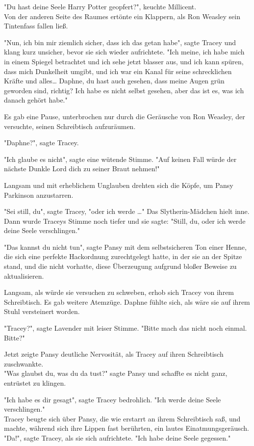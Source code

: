 {"Du hast deine Seele Harry Potter geopfert?", keuchte Millicent.\\ Von der anderen Seite des Raumes ertönte ein Klappern, als Ron Weasley sein Tintenfass fallen ließ.

"Nun, ich bin mir ziemlich sicher, dass ich das getan habe", sagte Tracey und klang kurz unsicher, bevor sie sich wieder aufrichtete. "Ich meine, ich habe mich in einem Spiegel betrachtet und ich sehe jetzt blasser aus, und ich kann spüren, dass mich Dunkelheit umgibt, und ich war ein Kanal für seine schrecklichen Kräfte und alles… Daphne, du hast auch gesehen, dass meine Augen grün geworden sind, richtig? Ich habe es nicht selbst gesehen, aber das ist es, was ich danach gehört habe."

Es gab eine Pause, unterbrochen nur durch die Geräusche von Ron Weasley, der versuchte, seinen Schreibtisch aufzuräumen.

"Daphne?", sagte Tracey.

"Ich glaube es nicht", sagte eine wütende Stimme. "Auf keinen Fall würde der nächste Dunkle Lord dich zu seiner Braut nehmen!"

Langsam und mit erheblichem Unglauben drehten sich die Köpfe, um Pansy Parkinson anzustarren.

"Sei still, du", sagte Tracey, "oder ich werde …" Das Slytherin-Mädchen hielt inne. Dann wurde Traceys Stimme noch tiefer und sie sagte: "Still, du, oder ich werde deine Seele verschlingen."

"Das kannst du nicht tun", sagte Pansy mit dem selbstsicheren Ton einer Henne, die sich eine perfekte Hackordnung zurechtgelegt hatte, in der sie an der Spitze stand, und die nicht vorhatte, diese Überzeugung aufgrund bloßer Beweise zu aktualisieren.

Langsam, als würde sie versuchen zu schweben, erhob sich Tracey von ihrem Schreibtisch. Es gab weitere Atemzüge. Daphne fühlte sich, als wäre sie auf ihrem Stuhl versteinert worden.

"Tracey?", sagte Lavender mit leiser Stimme. "Bitte mach das nicht noch einmal. Bitte?"

Jetzt zeigte Pansy deutliche Nervosität, als Tracey auf ihren Schreibtisch zuschwankte.\\ "Was glaubst du, was du da tust?" sagte Pansy und schaffte es nicht ganz, entrüstet zu klingen.

"Ich habe es dir gesagt", sagte Tracey bedrohlich. "Ich werde deine Seele verschlingen."\\ Tracey beugte sich über Pansy, die wie erstarrt an ihrem Schreibtisch saß, und machte, während sich ihre Lippen fast berührten, ein lautes Einatmungsgeräusch. "Da!", sagte Tracey, als sie sich aufrichtete. "Ich habe deine Seele gegessen."

}
